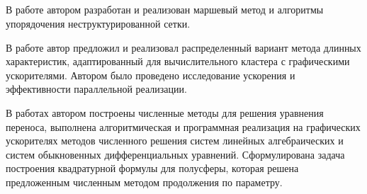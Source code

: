 

\renewcommand{\refname}{\large Публикации автора по теме диссертации}
\nocite{*}
\insertbiblioauthor                          %

\subsection*{\contribution}
В работе \cite{skalko2014} автором разработан и реализован маршевый метод и алгоритмы упорядочения неструктурированной сетки.

В работе \cite{tsybulin2015a} автор предложил и реализовал распределенный вариант метода длинных характеристик, адаптированный для вычислительного кластера с графическими ускорителями. Автором было проведено исследование ускорения и эффективности параллельной реализации.

В работах \cite{tsybulin2015b, miptconf55, miptconf56, miptconf57, miptconf54} автором построены численные методы для решения уравнения переноса, выполнена алгоритмическая и программная реализация на графических ускорителях методов численного решения систем линейных алгебраических и систем обыкновенных дифференциальных уравнений. Сформулирована задача построения квадратурной формулы для полусферы, которая решена предложенным численным методом продолжения по параметру.

